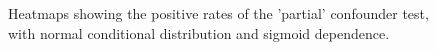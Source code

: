 \begin{figure}[H]
  \centering
  \caption{Heatmaps showing the positive rates of the 'partial' confounder test, with normal conditional distribution and sigmoid dependence.}
  \label{fig:sim-ccc-sig-partial}
\end{figure}